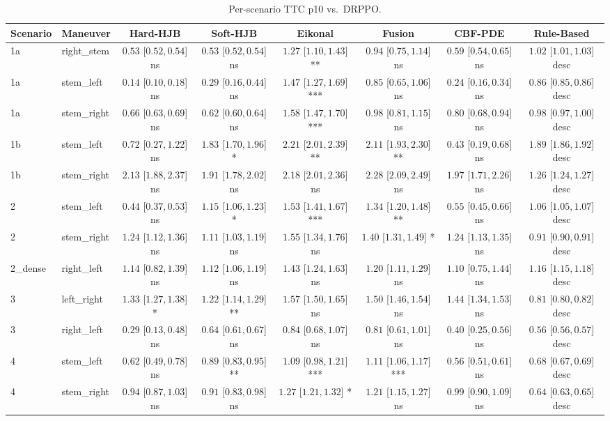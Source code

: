 \begin{table}[ht]
\centering
\caption{Per-scenario TTC p10 vs.\ DRPPO.}
\label{tab:per_scenario_ttc_p10_mean}
\begin{tabular}{llcccccc}
\toprule
Scenario & Maneuver & Hard-HJB & Soft-HJB & Eikonal & Fusion & CBF-PDE & Rule-Based \\
\midrule
1a & right_stem & $0.53$ [$0.52, 0.54$] ns & $0.53$ [$0.52, 0.54$] ns & $1.27$ [$1.10, 1.43$] ** & $0.94$ [$0.75, 1.14$] ns & $0.59$ [$0.54, 0.65$] ns & $1.02$ [$1.01, 1.03$] desc \\
1a & stem_left & $0.14$ [$0.10, 0.18$] ns & $0.29$ [$0.16, 0.44$] ns & $1.47$ [$1.27, 1.69$] *** & $0.85$ [$0.65, 1.06$] ns & $0.24$ [$0.16, 0.34$] ns & $0.86$ [$0.85, 0.86$] desc \\
1a & stem_right & $0.66$ [$0.63, 0.69$] ns & $0.62$ [$0.60, 0.64$] ns & $1.58$ [$1.47, 1.70$] *** & $0.98$ [$0.81, 1.15$] ns & $0.80$ [$0.68, 0.94$] ns & $0.98$ [$0.97, 1.00$] desc \\
1b & stem_left & $0.72$ [$0.27, 1.22$] ns & $1.83$ [$1.70, 1.96$] * & $2.21$ [$2.01, 2.39$] ** & $2.11$ [$1.93, 2.30$] ** & $0.43$ [$0.19, 0.68$] ns & $1.89$ [$1.86, 1.92$] desc \\
1b & stem_right & $2.13$ [$1.88, 2.37$] ns & $1.91$ [$1.78, 2.02$] ns & $2.18$ [$2.01, 2.36$] ns & $2.28$ [$2.09, 2.49$] ns & $1.97$ [$1.71, 2.26$] ns & $1.26$ [$1.24, 1.27$] desc \\
2 & stem_left & $0.44$ [$0.37, 0.53$] ns & $1.15$ [$1.06, 1.23$] * & $1.53$ [$1.41, 1.67$] *** & $1.34$ [$1.20, 1.48$] ** & $0.55$ [$0.45, 0.66$] ns & $1.06$ [$1.05, 1.07$] desc \\
2 & stem_right & $1.24$ [$1.12, 1.36$] ns & $1.11$ [$1.03, 1.19$] ns & $1.55$ [$1.34, 1.76$] ns & $1.40$ [$1.31, 1.49$] * & $1.24$ [$1.13, 1.35$] ns & $0.91$ [$0.90, 0.91$] desc \\
2_dense & right_left & $1.14$ [$0.82, 1.39$] ns & $1.12$ [$1.06, 1.19$] ns & $1.43$ [$1.24, 1.63$] ns & $1.20$ [$1.11, 1.29$] ns & $1.10$ [$0.75, 1.44$] ns & $1.16$ [$1.15, 1.18$] desc \\
3 & left_right & $1.33$ [$1.27, 1.38$] * & $1.22$ [$1.14, 1.29$] ** & $1.57$ [$1.50, 1.65$] ns & $1.50$ [$1.46, 1.54$] ns & $1.44$ [$1.34, 1.53$] ns & $0.81$ [$0.80, 0.82$] desc \\
3 & right_left & $0.29$ [$0.13, 0.48$] ns & $0.64$ [$0.61, 0.67$] ns & $0.84$ [$0.68, 1.07$] ns & $0.81$ [$0.61, 1.01$] ns & $0.40$ [$0.25, 0.56$] ns & $0.56$ [$0.56, 0.57$] desc \\
4 & stem_left & $0.62$ [$0.49, 0.78$] ns & $0.89$ [$0.83, 0.95$] ** & $1.09$ [$0.98, 1.21$] *** & $1.11$ [$1.06, 1.17$] *** & $0.56$ [$0.51, 0.61$] ns & $0.68$ [$0.67, 0.69$] desc \\
4 & stem_right & $0.94$ [$0.87, 1.03$] ns & $0.91$ [$0.83, 0.98$] ns & $1.27$ [$1.21, 1.32$] * & $1.21$ [$1.15, 1.27$] ns & $0.99$ [$0.90, 1.09$] ns & $0.64$ [$0.63, 0.65$] desc \\
\bottomrule
\end{tabular}
\end{table}
